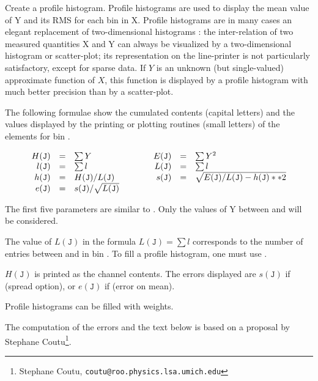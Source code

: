  
\Action Create a profile histogram.
Profile histograms are used to display the mean value of Y and
its RMS for each bin in X. Profile histograms are in many cases
an elegant replacement of two-dimensional histograms : the inter-relation
of two measured quantities X and Y can always be visualized
by a two-dimensional histogram or scatter-plot; its representation
on the line-printer is not particularly satisfactory, except
for sparse data. 
If $Y$ is an unknown (but single-valued) approximate
function of $X$, this function is displayed by a profile histogram
with much better precision than by a scatter-plot.
 
The following formulae show the cumulated contents (capital letters)
and the values displayed by the printing or plotting routines
(small letters) of the elements for bin .
 
\newcommand{\J}{\mathtt{J}}
\[
\begin{array}{r@{\quad=\quad}l@{\qquad\qquad}r@{\quad=\quad}l}
H(\J) &  \sum Y                        &
E(\J) &  \sum {Y^{2}}                  \\
l(\J) &  \sum l                        &
L(\J) &  \sum l                        \\
h(\J) & H(\J)/L(\J)                      &
s(\J) & \sqrt{E(\J)/L(\J)-h(\J)**2}       \\
e(\J) & s(\J)  /  \sqrt {L(\J)}
\end{array}
\]
 
The first five parameters are similar to .
Only the values of Y between  and  will be considered.

The value of \begin{math}L(\J)\end{math} in the formula \begin{math}
  L(\J) = \sum l \end{math} corresponds to the number of entries
between  and  in bin .  To fill a profile histogram, one must
use .
 
$H(\J)$ is printed as the channel contents.
The errors displayed are $s(\J)$ if  (spread option),
or $e(\J)$ if  (error on mean).

Profile histograms can be filled with weights.

The computation of the errors and the text below 
is based on a proposal by Stephane Coutu\footnote{Stephane Coutu,
                        \texttt{coutu@roo.physics.lsa.umich.edu}}.

